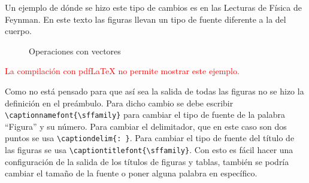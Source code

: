 Un ejemplo de dónde se hizo este tipo de cambios es en las Lecturas de Física
de Feynman. En este texto las figuras llevan un tipo de fuente diferente a la
del cuerpo.
\ifluatex%
\begin{figure}[h]
\centering
\begin{minipage}{0.4\linewidth}
\centering
{}

  \captionnamefont{\sffamily}
  \label{fig:vect1}
\end{minipage}
\hfill
\begin{minipage}{0.4\linewidth}
\centering
{}

  \captionnamefont{\sffamily}
  \label{fig:vect2}
\end{minipage}
  \captionnamefont{\sffamily}
  \caption{\sffamily Operaciones con vectores}
  \label{fig:vect}
\end{figure}
\else
\ifpdftex%
\begin{center}
\textcolor{red}{La compilación con pdf\LaTeX{} no permite mostrar este
ejemplo.}
\end{center}
\fi
\fi

Como no está pensado para que así sea la salida de todas las figuras no se
hizo la definición en el preámbulo. Para dicho cambio se debe escribir
\verb|\captionnamefont{\sffamily}| para cambiar el tipo de fuente de la
palabra \enquote{Figura} y su número. Para cambiar el delimitador, que en este caso
son dos puntos se usa \verb|\captiondelim{: }|. Para cambiar el tipo de
fuente del título de las figuras se usa \verb|\captiontitlefont{\sffamily}|.
Con esto es fácil hacer una configuración de la salida de los títulos de
figuras y tablas, también se podría cambiar el tamaño de la fuente o poner
alguna palabra en específico.

